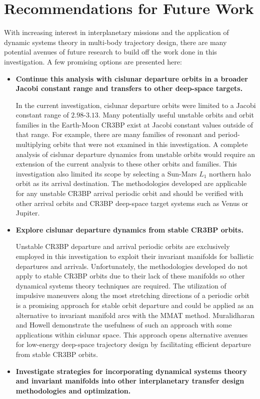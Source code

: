 \section{Recommendations for Future Work}
With increasing interest in interplanetary missions and the application of dynamic systems theory
in multi-body trajectory design, there are many potential avenues of future research to build off
the work done in this investigation. A few promising options are presented here:
\begin{itemize}
    \item   \textbf{Continue this analysis with cislunar departure orbits in a broader Jacobi
            constant range and transfers to other deep-space targets.}

            In the current investigation, cislunar departure orbits were limited to a Jacobi
            constant range of $2.98$-$3.13$. Many potentially useful unstable orbits and orbit
            families in the Earth-Moon CR3BP exist at Jacobi constant values outside of that range.
            For example, there are many families of resonant and period-multiplying orbits that
            were not examined in this investigation. A complete analysis of cislunar departure
            dynamics from unstable orbits would require an extension of the current analysis to
            these other orbits and families. This investigation also limited its scope by selecting
            a Sun-Mars $L_{1}$ northern halo orbit as its arrival destination. The methodologies
            developed are applicable for any unstable CR3BP arrival periodic orbit and should be
            verified with other arrival orbits and CR3BP deep-space target systems such as Venus or
            Jupiter.
    \item   \textbf{Explore cislunar departure dynamics from stable CR3BP orbits.}
    
            Unstable CR3BP departure and arrival periodic orbits are exclusively employed in this
            investigation to exploit their invariant manifolds for ballistic departures and
            arrivals. Unfortunately, the methodologies developed do not apply to stable CR3BP
            orbits due to their lack of these manifolds so other dynamical systems theory
            techniques are required. The utilization of impulsive maneuvers along the most
            stretching directions of a periodic orbit is a promising approach for stable orbit
            departure and could be applied as an alternative to invariant manifold arcs with the
            MMAT method. Muralidharan and Howell demonstrate the usefulness of such an approach
            with some applications within cislunar space\cite{Muralidharan:2022}. This approach
            opens alternative avenues for low-energy deep-space trajectory design by facilitating
            efficient departure from stable CR3BP orbits.
    \item   \textbf{Investigate strategies for incorporating dynamical systems theory and invariant
            manifolds into other interplanetary transfer design methodologies and optimization.}


\end{itemize}

